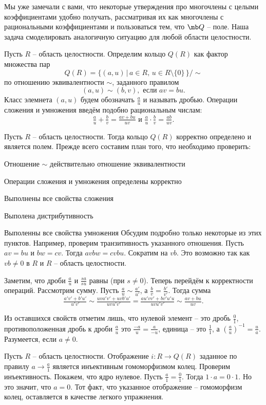 Мы уже замечали с вами, что некоторые утверждения про многочлены с целыми коэффициентами удобно получать, рассматривая их как многочлены с рациональными коэффициентами и пользоваться тем, что $\mb Q$ -- поле. Наша задача смоделировать аналогичную ситуацию для любой области целостности.

 Пусть  $R$ -- область целостности. Определим кольцо $Q(R)$ как
фактор множества пар
$$ Q(R)=\{ (a,u)\,|\, a\in R, \, u\in R\setminus\{0\} \,\}/\sim$$
по отношению эквивалентности $\sim$, заданного правилом
$$ (a,u)\sim (b,v), \text{ если } av=bu.$$
Класс элемнета $(a,u)$ будем обозначать  $\frac{a}{u}$ и называть дробью.
Операции сложения и умножения введём подобно рациональным числам:
$$ \tfrac{a}{u}+\tfrac{b}{v}=\tfrac{av+bu}{uv} \text{ и } \tfrac{a}{u}\cdot\tfrac{b}{v}=\tfrac{ab}{uv}.$$
\edfn




 Пусть  $R$ -- область целостности. Тогда  кольцо $Q(R)$ корректно определено и является полем.
\ethrm
\proof
Прежде всего составим план того, что необходимо проверить:
\enm
\item Отношение $\sim$ действительно отношение эквивалентности
\item Операции сложения и умножения определены корректно
\item Выполнены все свойства сложения
\item Выполена дистрибутивность
\item Выполенны все свойства умножения
\eenm
Обсудим подробно только некоторые из этих пунктов. Например, проверим транзитивность указанного отношения. Пусть $av=bu$ и $bw=cv$. Тогда $avbw=cvbu$. Сократим на $vb$. Это возможно так как $vb \neq 0$ в $R$ и $R$ -- область целостности.

Заметим, что дроби $\frac{a}{u}$ и $\frac{sa}{su}$ равны (при $s\neq 0$).
Теперь перейдём к корректности операций. Рассмотрим сумму. Пусть $\tfrac{a}{u}\sim \tfrac{a'}{u'}$, а  $\tfrac{b}{v}=\tfrac{b'}{v'}$. Тогда сумма
$$\tfrac{a'v'+b'u'}{u'v'}\sim \tfrac{uva'v'+uvb'u'}{uvu'v'}= \tfrac{au'vv'+bv'u'u}{uvu'v'}\sim \tfrac{av+bu}{uv}.$$

Из оставшихся свойств отметим лишь, что нулевой элемент -- это дробь $\frac{0}{1}$, противоположенная дробь к дроби $\frac{a}{u}$ это $\frac{-a}{u}=\frac{a}{-u}$, единица -- это $\frac{1}{1}$, а $\left(\frac{a}{u}\right)^{-1}=\frac{u}{a}$. Разумеется, если $a\neq 0$.
\endproof

 Пусть  $R$ -- область целостности. Отображение $i\colon R\to Q(R)$ заданное по правилу $a\to \tfrac{a}{1}$ является инъективным гомоморфизмом колец.
\ethrm
\proof Проверим инъективность. Покажем, что ядро нулевое. Пусть $\tfrac{a}{1}= \tfrac{0}{1}$. Тогда $1\cdot a=0\cdot 1$. Но это значит, что $a=0$. 
Тот факт, что указанное отображение -- гомоморфизм колец, оставляется в качестве легкого упражнения. 

